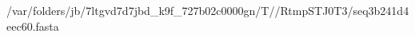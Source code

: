 \documentclass[10pt]{article}
\begin{document}
\begin{texshade}{/var/folders/jb/7ltgvd7d7jbd_k9f_727b02c0000gn/T//RtmpSTJ0T3/seq3b241d4eec60.fasta}
\hidelogoscale
{}
\showlegend
\end{texshade}
\end{document}
